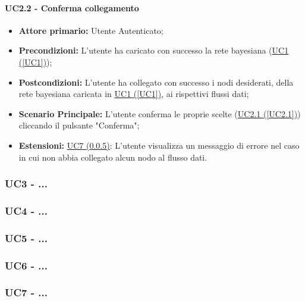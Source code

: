 \paragraph{UC2.2 - Conferma collegamento}\label{UC2.2}
\begin{itemize}
\item \textbf{Attore primario:} Utente Autenticato;
\item \textbf{Precondizioni:} L'utente ha caricato con successo la rete bayesiana (\hyperref[UC1]{UC1 (\ref*{UC1})});
\item \textbf{Postcondizioni:} L'utente ha collegato con successo i nodi desiderati, della rete bayesiana caricata in \hyperref[UC1]{UC1 (\ref*{UC1})}, ai rispettivi flussi dati;
\item \textbf{Scenario Principale:} L'utente conferma le proprie scelte (\hyperref[UC2.1]{UC2.1 (\ref*{UC2.1})}) cliccando il pulsante "Conferma";
\item \textbf{Estensioni:} \hyperref[UC7]{UC7 (\ref*{UC7})}: L'utente visualizza un messaggio di errore nel caso in cui non abbia collegato alcun nodo al flusso dati.
\end{itemize}

\subsubsection{UC3 - ...}\label{UC3}

\subsubsection{UC4 - ...}\label{UC4}

\subsubsection{UC5 - ...}\label{UC5}

\subsubsection{UC6 - ...}\label{UC6}

\subsubsection{UC7 - ...}\label{UC7}